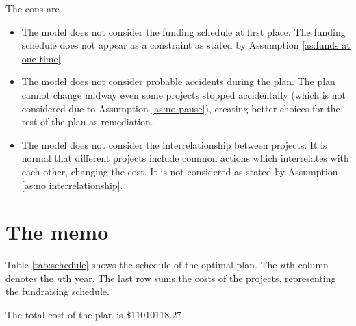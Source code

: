 \documentclass{article}
\begin{document}
The cons are
\begin{itemize}
\item The model does not consider the funding schedule at first place.
The funding schedule does not appear as a constraint as stated by Assumption \ref{as:funds at one time}.
\item The model does not consider probable accidents during the plan.
The plan cannot change midway even some projects stopped accidentally (which is not considered due to Assumption \ref{as:no pause}), creating better choices for the rest of the plan as remediation.
\item The model does not consider the interrelationship between projects.
It is normal that different projects include common actions which interrelates with each other, changing the cost.
It is not considered as stated by Assumption \ref{as:no interrelationship}.
\end{itemize}

\newpage

\section{The memo}
\label{sec:memo}

Table \ref{tab:schedule} shows the schedule of the optimal plan.
The $n$th column denotes the $n$th year.
The last row sums the costs of the projects, representing the fundraising schedule.

The total cost of the plan is $\$11010118.27$.
\end{document}
